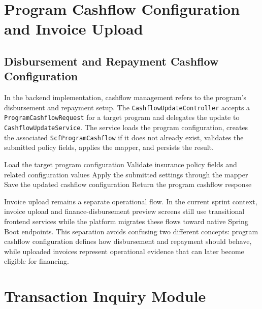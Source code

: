 \section{Program Cashflow Configuration and Invoice Upload}
\label{sec:invoice_cashflow}

\subsection{Disbursement and Repayment Cashflow Configuration}
\label{subsec:cashflow_validation}

In the backend implementation, cashflow management refers to the program's disbursement and repayment setup. The \texttt{CashflowUpdateController} accepts a \texttt{ProgramCashflowRequest} for a target program and delegates the update to \texttt{CashflowUpdateService}. The service loads the program configuration, creates the associated \texttt{ScfProgramCashflow} if it does not already exist, validates the submitted policy fields, applies the mapper, and persists the result.

\begin{algorithm}[H]
    \DontPrintSemicolon
    \BlankLine
    Load the target program configuration\;
    Validate insurance policy fields and related configuration values\;
    Apply the submitted settings through the mapper\;
    Save the updated cashflow configuration\;
    Return the program cashflow response\;
    \caption{Program cashflow update routine}
    \label{alg:cashflow_update}
\end{algorithm}

Invoice upload remains a separate operational flow. In the current sprint context, invoice upload and finance-disbursement preview screens still use transitional frontend services while the platform migrates these flows toward native Spring Boot endpoints. This separation avoids confusing two different concepts: program cashflow configuration defines how disbursement and repayment should behave, while uploaded invoices represent operational evidence that can later become eligible for financing.

\section{Transaction Inquiry Module}
\label{sec:transaction_inquiry_module}

